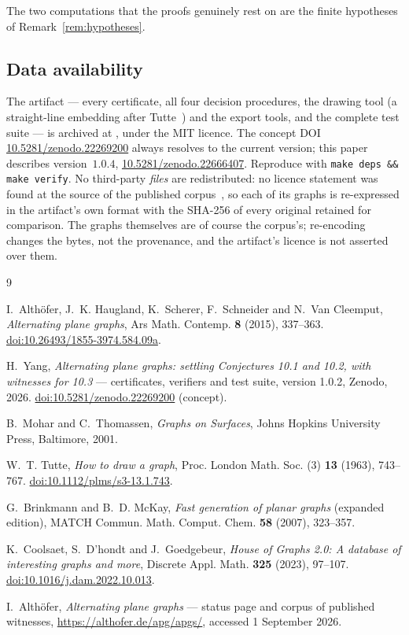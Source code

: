 \documentclass{baustms}
\theoremstyle{cupthm}
\theoremstyle{cupdefn}
\theoremstyle{cuprem}
\begin{document}
The two computations that the proofs genuinely rest on are the finite hypotheses
of Remark~\ref{rem:hypotheses}.

\subsection*{Data availability}

The artifact --- every certificate, all four decision procedures, the drawing
tool (a straight-line embedding after Tutte~\cite{Tutte1963}) and the export
tools, and the complete test suite --- is archived at
\cite{artifact}, under the MIT licence. The concept DOI
\href{https://doi.org/10.5281/zenodo.22269200}{10.5281/zenodo.22269200} always
resolves to the current version; this paper describes version~$1.0.4$,
\href{https://doi.org/10.5281/zenodo.22666407}{10.5281/zenodo.22666407}.
Reproduce with \texttt{make deps \&\& make verify}. No third-party \emph{files}
are redistributed: no licence statement was found at the source of the published
corpus~\cite{APGcorpus}, so each of its graphs is re-expressed in the artifact's
own format with the SHA-256 of every original retained for comparison. The
graphs themselves are of course the corpus's; re-encoding changes the bytes, not
the provenance, and the artifact's licence is not asserted over them.

\begin{thebibliography}{9}

I.~Alth\"ofer, J.~K. Haugland, K.~Scherer, F.~Schneider and N.~Van Cleemput,
\emph{Alternating plane graphs},
Ars Math. Contemp. \textbf{8} (2015), 337--363.
\href{https://doi.org/10.26493/1855-3974.584.09a}{doi:10.26493/1855-3974.584.09a}.

H.~Yang, \emph{Alternating plane graphs: settling Conjectures 10.1 and 10.2,
with witnesses for 10.3} --- certificates, verifiers and test suite, version 1.0.2, Zenodo, 2026.
\href{https://doi.org/10.5281/zenodo.22269200}{doi:10.5281/zenodo.22269200}
(concept).

B.~Mohar and C.~Thomassen, \emph{Graphs on Surfaces},
Johns Hopkins University Press, Baltimore, 2001.

W.~T. Tutte, \emph{How to draw a graph},
Proc. London Math. Soc. (3) \textbf{13} (1963), 743--767.
\href{https://doi.org/10.1112/plms/s3-13.1.743}{doi:10.1112/plms/s3-13.1.743}.

G.~Brinkmann and B.~D. McKay,
\emph{Fast generation of planar graphs} (expanded edition),
MATCH Commun. Math. Comput. Chem. \textbf{58} (2007), 323--357.

K.~Coolsaet, S.~D'hondt and J.~Goedgebeur,
\emph{House of Graphs 2.0: A database of interesting graphs and more},
Discrete Appl. Math. \textbf{325} (2023), 97--107.
\href{https://doi.org/10.1016/j.dam.2022.10.013}{doi:10.1016/j.dam.2022.10.013}.

I.~Alth\"ofer, \emph{Alternating plane graphs} --- status page and corpus of
published witnesses, \url{https://althofer.de/apg/apgs/}, accessed 1 September
2026.

\end{thebibliography}
\end{document}
